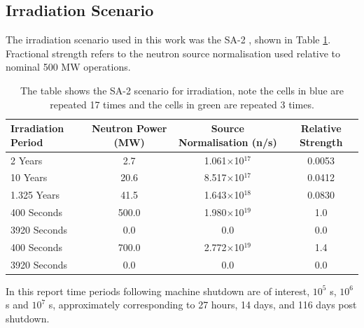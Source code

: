 \documentclass[12pt]{article}
\begin{document}
\subsection{Irradiation Scenario}
The irradiation scenario used in this work was the SA-2 \cite{sa2_irradiation}, 
shown in Table \ref{tab:irrad_scenario}. Fractional strength refers to the 
neutron source normalisation used relative to nominal 500 MW operations.
\begin{table}[ht!]
   \begin{tabular}{| l | c | c | c |}
      \hline 
      Irradiation Period & Neutron Power (MW) & Source Normalisation (n/s) &  Relative Strength \\
      \hline
      2 Years & 2.7 & 1.061$\times$10$^{17}$ & 0.0053 \\
      10 Years & 20.6 & 8.517$\times$10$^{17}$ & 0.0412 \\
      1.325 Years & 41.5 & 1.643$\times$10$^{18}$ & 0.0830 \\
      \cellcolor{blue!25} \cellcolor{blue!25} 400 Seconds & \cellcolor{blue!25} 500.0 & 1.980$\times$10$^19$ & \cellcolor{blue!25} 1.0  \\
      \cellcolor{blue!25} 3920 Seconds & \cellcolor{blue!25} 0.0 & \cellcolor{blue!25} 0.0 & \cellcolor{blue!25} 0.0 \\
      \cellcolor{green!25} 400 Seconds & \cellcolor{green!25} 700.0 & \cellcolor{green!25} 2.772$\times$10$^19$ &\cellcolor{green!25} 1.4 \\
      \cellcolor{green!25} 3920 Seconds & \cellcolor{green!25} 0.0 & \cellcolor{green!25} 0.0 &\cellcolor{green!25} 0.0 \\
      \hline
\end{tabular}
\caption{The table shows the SA-2 scenario for irradiation, note the
         cells in \textcolor{blue!25}{blue} are repeated 17 times
         and the cells in \textcolor{green!25}{green} are repeated 3
         times.}
\label{tab:irrad_scenario}
\end{table}
In this report time periods following machine shutdown are of interest,
$10^5$ s, $10^6$ s and $10^7$ s, approximately corresponding to 27 
hours, 14 days, and 116 days post shutdown.
\end{document}
